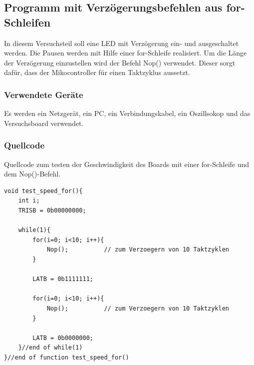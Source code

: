 \documentclass[12pt,a4paper]{article}
\begin{document}
\subsection{Programm mit Verzögerungsbefehlen aus for-Schleifen}

In diesem Versuchsteil soll eine LED  mit Verzögerung ein- und ausgeschaltet werden. Die Pausen werden mit Hilfe einer for-Schleife realisiert. Um die Länge der Verzögerung einzustellen wird der Befehl Nop() verwendet. Dieser sorgt dafür, dass der Mikocontroller für einen Taktzyklus aussetzt.

\subsubsection*{Verwendete Geräte}

Es werden ein Netzgerät, ein PC, ein Verbindungskabel, ein Oszillsokop und das Versuchsboard verwendet.


\subsubsection*{Quellcode}

Quellcode zum testen der Geschwindigkeit des Boards mit einer for-Schleife und dem Nop()-Befehl.

\lstset{language=C, basicstyle=\tiny}
\begin{lstlisting}[caption = {Geschwindigkeitstest mit einer for-Schleife}, label=lst:g_2,captionpos=b]
void test_speed_for(){
	int i;
	TRISB = 0b00000000;
	
	while(1){
		for(i=0; i<10; i++){
			Nop();			// zum Verzoegern von 10 Taktzyklen
		}
	
		LATB = 0b1111111;
		
		for(i=0; i<10; i++){
			Nop();			// zum Verzoegern von 10 Taktzyklen
		}
		
		LATB = 0b0000000;
	}//end of while(1)
}//end of function test_speed_for()
\end{lstlisting}
\end{document}
